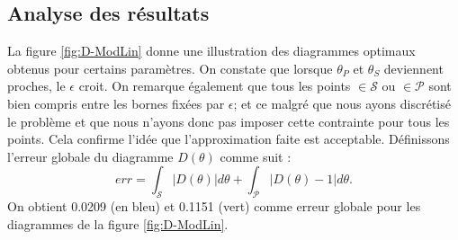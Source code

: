 \subsection{Analyse des résultats}
La figure \ref{fig:D-ModLin} donne une illustration des diagrammes optimaux obtenus pour certains paramètres. On constate que lorsque $\theta_P$ et $\theta_S$ deviennent proches, le $\epsilon$ croit. On remarque également que tous les points $\in \mathcal{S}$ ou $\in \mathcal{P}$ sont bien compris entre les bornes fixées par $\epsilon$; et ce malgré que nous ayons discrétisé le problème et que nous n'ayons donc pas imposer cette contrainte pour tous les points. Cela confirme l'idée que l'approximation faite est acceptable. Définissons l'erreur globale du diagramme $D(\theta)$ comme suit : 
\begin{equation} \label{eq:erreurDiagramme}
err = \int _{\mathcal{S}} |D(\theta)| d\theta + \int_{\mathcal{P}} |D(\theta) - 1| d\theta.
\end{equation}
On obtient 0.0209 (en bleu) et 0.1151 (vert) comme erreur globale pour les diagrammes de la figure \ref{fig:D-ModLin}. 
